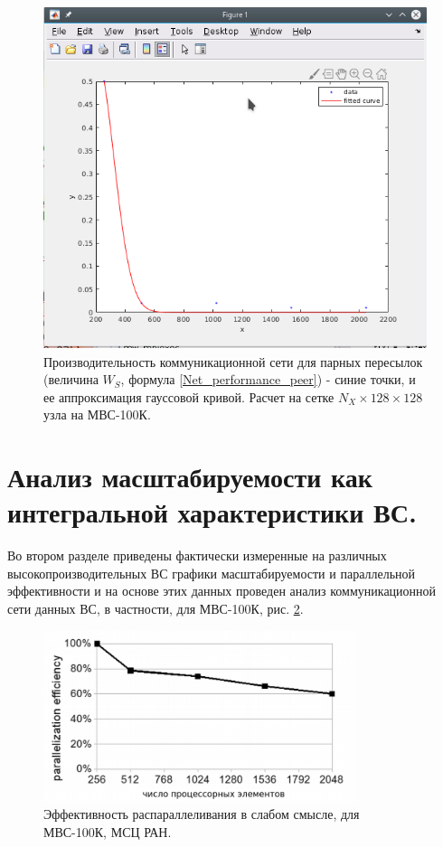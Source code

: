  
\begin{figure}[h]
	\begin{center}
		\includegraphics[height=10cm,keepaspectratio]{images/W_S_MVS_100K_Gaussf.png}
		\caption{
			Производительность коммуникационной сети для парных пересылок (величина $W_S$, формула \ref{Net_performance_peer}) - синие точки, и ее аппроксимация гауссовой кривой. Расчет на сетке $N_X \times 128 \times 128$ узла на МВС-100К. 
		}
		\label{scale_W_S_MVS_100K_Gauss}
	\end{center} 
\end{figure}

      
\clearpage	    
	    
	 

		
		
		\section{Анализ масштабируемости как интегральной характеристики ВС.}
		
		Во втором разделе приведены фактически измеренные на различных высокопроизводительных ВС графики масштабируемости и параллельной эффективности и на основе этих данных проведен анализ коммуникационной сети данных ВС, в частности, для МВС-100К, рис. \ref{eff2}. 
		
		\begin{figure}[h]
			\begin{center}
				\includegraphics[height=5cm,keepaspectratio]{images/eff_weak_JSCC.png}
				\caption{
					Эффективность распараллеливания в слабом смысле, для МВС-100К, МСЦ РАН.
				}
				\label{eff2}
			\end{center} 
		\end{figure}
		
